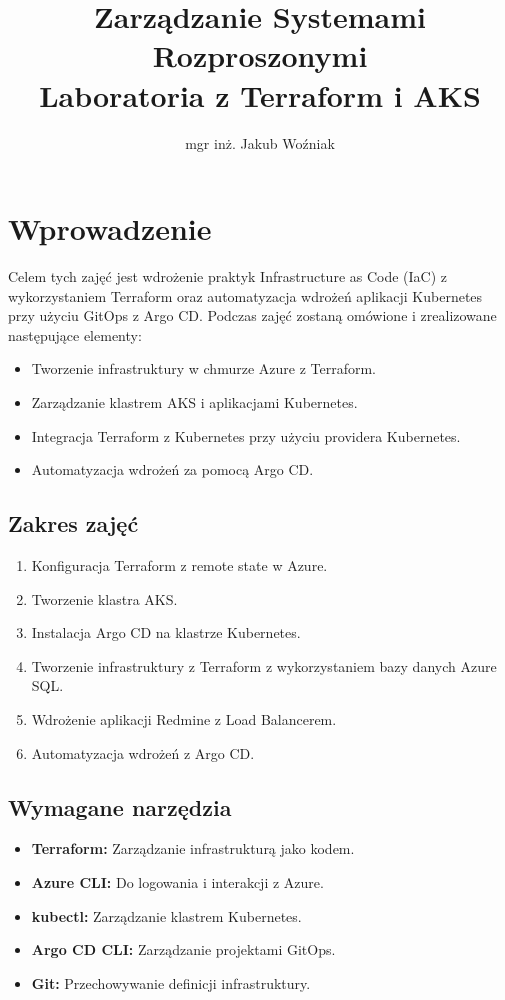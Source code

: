 \documentclass{article}
\title{Zarządzanie Systemami Rozproszonymi\\Laboratoria z Terraform i AKS}
\author{mgr inż. Jakub Woźniak}
\date{}
\begin{document}
\maketitle

\section{Wprowadzenie}
Celem tych zajęć jest wdrożenie praktyk Infrastructure as Code (IaC) z wykorzystaniem Terraform oraz automatyzacja wdrożeń aplikacji Kubernetes przy użyciu GitOps z Argo CD. Podczas zajęć zostaną omówione i zrealizowane następujące elementy:
\begin{itemize}
    \item Tworzenie infrastruktury w chmurze Azure z Terraform.
    \item Zarządzanie klastrem AKS i aplikacjami Kubernetes.
    \item Integracja Terraform z Kubernetes przy użyciu providera Kubernetes.
    \item Automatyzacja wdrożeń za pomocą Argo CD.
\end{itemize}

\subsection{Zakres zajęć}
\begin{enumerate}
    \item Konfiguracja Terraform z remote state w Azure.
    \item Tworzenie klastra AKS.
    \item Instalacja Argo CD na klastrze Kubernetes.
    \item Tworzenie infrastruktury z Terraform z wykorzystaniem bazy danych Azure SQL.
    \item Wdrożenie aplikacji Redmine z Load Balancerem.
    \item Automatyzacja wdrożeń z Argo CD.
\end{enumerate}

\subsection{Wymagane narzędzia}
\begin{itemize}
    \item \textbf{Terraform:} Zarządzanie infrastrukturą jako kodem.
    \item \textbf{Azure CLI:} Do logowania i interakcji z Azure.
    \item \textbf{kubectl:} Zarządzanie klastrem Kubernetes.
    \item \textbf{Argo CD CLI:} Zarządzanie projektami GitOps.
    \item \textbf{Git:} Przechowywanie definicji infrastruktury.
\end{itemize}
\end{document}
